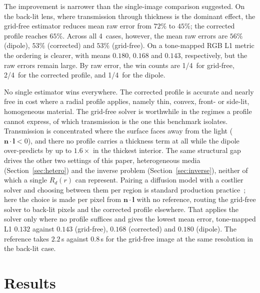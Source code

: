 \documentclass[11pt]{article}
\providecommand{\RGtCases}{1}
\providecommand{\RGtErrOurs}{0}
\providecommand{\RGtErrDip}{0}
\providecommand{\RGtErrCorr}{0}
\providecommand{\RGtMeanOurs}{0}
\providecommand{\RGtMeanDip}{0}
\providecommand{\RGtMeanCorr}{0}
\providecommand{\RGtToneOurs}{0.000}
\providecommand{\RGtToneDip}{0.000}
\providecommand{\RGtToneCorr}{0.000}
\providecommand{\RGtToneHybrid}{0.000}
\providecommand{\RGtWinOurs}{0}
\providecommand{\RGtWinDip}{0}
\providecommand{\RGtWinCorr}{0}
\providecommand{\RGtThickX}{0}
\providecommand{\RGtPtSec}{0}
\providecommand{\RGtOursSec}{0}
\renewcommand{\RGtCases}{4}
\renewcommand{\RGtErrOurs}{45}
\renewcommand{\RGtErrDip}{72}
\renewcommand{\RGtErrCorr}{65}
\renewcommand{\RGtMeanOurs}{53}
\renewcommand{\RGtMeanDip}{56}
\renewcommand{\RGtMeanCorr}{53}
\renewcommand{\RGtToneOurs}{0.143}
\renewcommand{\RGtToneDip}{0.180}
\renewcommand{\RGtToneCorr}{0.168}
\renewcommand{\RGtToneHybrid}{0.132}
\renewcommand{\RGtWinOurs}{1}
\renewcommand{\RGtWinDip}{1}
\renewcommand{\RGtWinCorr}{2}
\renewcommand{\RGtThickX}{1.6}
\renewcommand{\RGtPtSec}{2.2}
\renewcommand{\RGtOursSec}{0.8}
\begin{document}
The improvement is narrower than the single-image comparison suggested. On the
back-lit lens, where transmission through thickness is the dominant effect, the
grid-free estimator reduces mean raw error from $\RGtErrDip\%$ to
$\RGtErrOurs\%$; the corrected profile reaches $\RGtErrCorr\%$. Across all
\RGtCases\ cases, however, the mean raw errors are $\RGtMeanDip\%$ (dipole),
$\RGtMeanCorr\%$ (corrected) and $\RGtMeanOurs\%$ (grid-free). On a tone-mapped
RGB L1 metric the ordering is clearer, with means $\RGtToneDip$,
$\RGtToneCorr$ and $\RGtToneOurs$, respectively, but the raw errors remain
large. By raw error, the win counts are \RGtWinOurs/\RGtCases\ for grid-free,
\RGtWinCorr/\RGtCases\ for the corrected profile, and
\RGtWinDip/\RGtCases\ for the dipole.

No single estimator wins everywhere. The corrected profile is accurate and nearly free in cost where a radial profile applies, namely thin, convex, front- or side-lit, homogeneous material. The grid-free solver is worthwhile in the regimes a profile cannot express, of which transmission is the one this benchmark isolates.
Transmission is concentrated where the surface faces away from the light
($\mathbf{n}\cdot\mathbf{l}<0$), and there no profile carries a thickness term at
all while the dipole over-predicts by up to $\RGtThickX\times$ in the thickest
interior. The same structural gap drives the other two settings of this paper,
heterogeneous media (Section~\ref{sec:hetero}) and the inverse problem
(Section~\ref{sec:inverse}), neither of which a single $R_d(r)$ can represent.
Pairing a diffusion model with a costlier solver and choosing between them per
region is standard production practice~\cite{chiang2016,werner2024}; here the
choice is made per pixel from $\mathbf{n}\cdot\mathbf{l}$ with no reference,
routing the grid-free solver to back-lit pixels and the corrected profile
elsewhere. That applies the solver only where no profile suffices and gives the
lowest mean error, tone-mapped L1 $\RGtToneHybrid$ against $\RGtToneOurs$
(grid-free), $\RGtToneCorr$ (corrected) and $\RGtToneDip$ (dipole). The reference
takes $\RGtPtSec$\,s against $\RGtOursSec$\,s for the grid-free image at the same
resolution in the back-lit case.

\section{Results}
\label{sec:results}
\end{document}
